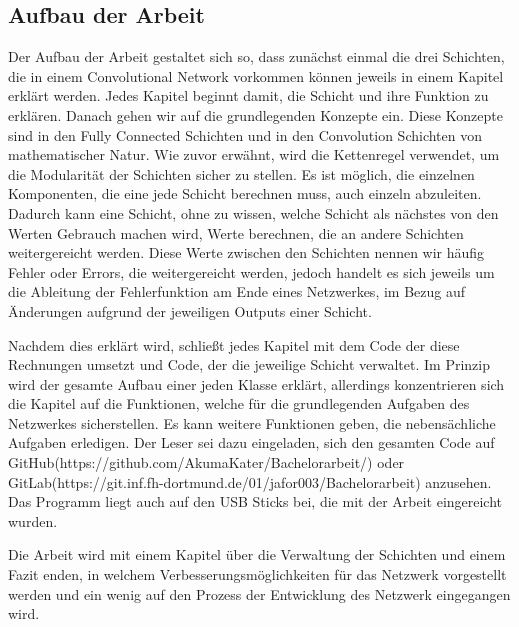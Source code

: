 \documentclass[12pt]{article}
\begin{document}
\subsection{Aufbau der Arbeit}
Der Aufbau der Arbeit gestaltet sich so, dass zunächst einmal die drei Schichten, die in einem Convolutional Network vorkommen können jeweils in einem Kapitel erklärt werden. Jedes Kapitel beginnt damit, die Schicht und ihre Funktion zu erklären. Danach gehen wir auf die grundlegenden Konzepte ein. Diese Konzepte sind in den Fully Connected Schichten und in den Convolution Schichten von mathematischer Natur. Wie zuvor erwähnt, wird die Kettenregel verwendet, um die Modularität der Schichten sicher zu stellen. Es ist möglich, die einzelnen Komponenten, die eine jede Schicht berechnen muss, auch einzeln abzuleiten. Dadurch kann eine Schicht, ohne zu wissen, welche Schicht als nächstes von den Werten Gebrauch machen wird, Werte berechnen, die an andere Schichten weitergereicht werden. Diese Werte zwischen den Schichten nennen wir häufig Fehler oder Errors, die weitergereicht werden, jedoch handelt es sich jeweils um die Ableitung der Fehlerfunktion am Ende eines Netzwerkes, im Bezug auf Änderungen aufgrund der jeweiligen Outputs einer Schicht.

\sloppy

Nachdem dies erklärt wird, schließt jedes Kapitel mit dem Code der diese Rechnungen umsetzt und Code, der die jeweilige Schicht verwaltet. Im Prinzip wird der gesamte Aufbau einer jeden Klasse erklärt, allerdings konzentrieren sich die Kapitel auf die Funktionen, welche für die grundlegenden Aufgaben des Netzwerkes sicherstellen. Es kann weitere Funktionen geben, die nebensächliche Aufgaben erledigen. Der Leser sei dazu eingeladen, sich den gesamten Code auf GitHub(https://github.com/AkumaKater/Bachelorarbeit/) oder GitLab(https://git.inf.fh-dortmund.de/01/jafor003/Bachelorarbeit) anzusehen. Das Programm liegt auch auf den USB Sticks bei, die mit der Arbeit eingereicht wurden.

Die Arbeit wird mit einem Kapitel über die Verwaltung der Schichten und einem Fazit enden, in welchem Verbesserungsmöglichkeiten für das Netzwerk vorgestellt werden und ein wenig auf den Prozess der Entwicklung des Netzwerk eingegangen wird.
\end{document}
